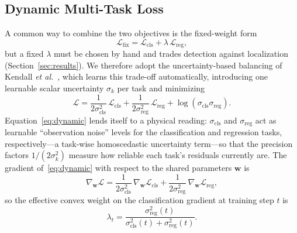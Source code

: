 \documentclass[5p,twocolumn]{elsarticle}
\begin{document}
\subsection{Dynamic Multi-Task Loss}
A common way to combine the two objectives is the fixed-weight form
\begin{equation}
    \mathcal{L}_{\mathrm{fix}} = \mathcal{L}_{\mathrm{cls}} + \lambda\,\mathcal{L}_{\mathrm{reg}},
    \label{eq:fixed}
\end{equation}
but a fixed $\lambda$ must be chosen by hand and trades detection against localization (Section~\ref{sec:results}). We therefore adopt the uncertainty-based balancing of Kendall \emph{et al.}~\cite{kendall2018mtl}, which learns this trade-off automatically, introducing one learnable scalar uncertainty $\sigma_k$ per task and minimizing
\begin{equation}
    \mathcal{L} = \frac{1}{2\sigma_{\mathrm{cls}}^{2}}\,\mathcal{L}_{\mathrm{cls}} + \frac{1}{2\sigma_{\mathrm{reg}}^{2}}\,\mathcal{L}_{\mathrm{reg}} + \log\!\left(\sigma_{\mathrm{cls}}\sigma_{\mathrm{reg}}\right).
    \label{eq:dynamic}
\end{equation}
Equation~\eqref{eq:dynamic} lends itself to a physical reading: $\sigma_{\mathrm{cls}}$ and $\sigma_{\mathrm{reg}}$ act as learnable ``observation noise'' levels for the classification and regression tasks, respectively---a task-wise homoscedastic uncertainty term---so that the precision factors $1/(2\sigma_k^{2})$ measure how reliable each task's residuals currently are. The gradient of~\eqref{eq:dynamic} with respect to the shared parameters $\mathbf{w}$ is
\begin{equation}
    \nabla_{\mathbf{w}}\mathcal{L} = \frac{1}{2\sigma_{\mathrm{cls}}^{2}}\,\nabla_{\mathbf{w}}\mathcal{L}_{\mathrm{cls}} + \frac{1}{2\sigma_{\mathrm{reg}}^{2}}\,\nabla_{\mathbf{w}}\mathcal{L}_{\mathrm{reg}},
    \label{eq:grad}
\end{equation}
so the effective convex weight on the classification gradient at training step $t$ is
\begin{equation}
    \lambda_t = \frac{\sigma_{\mathrm{reg}}^{2}(t)}{\sigma_{\mathrm{cls}}^{2}(t)+\sigma_{\mathrm{reg}}^{2}(t)}.
    \label{eq:lambda_t}
\end{equation}
\end{document}

